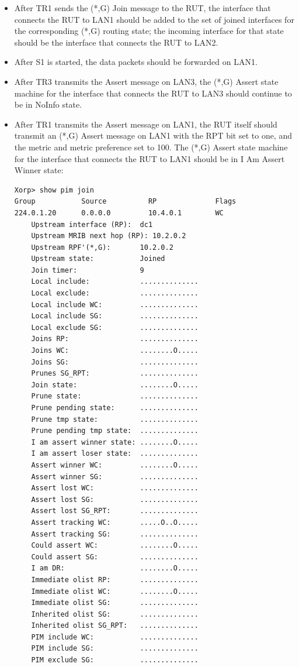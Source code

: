 \documentclass[11pt]{report}
\begin{document}

\begin{itemize}

  \item After TR1 sends the (*,G) Join message to the RUT, the interface that
  connects the RUT to LAN1 should be added to the set of joined interfaces for
  the corresponding (*,G) routing state; the incoming interface for that state
  should be the interface that connects the RUT to LAN2.

  \item After S1 is started, the data packets should be forwarded on LAN1.

  \item After TR3 transmits the Assert message on LAN3, the (*,G) Assert state
  machine for the interface that connects the RUT to LAN3 should continue to
  be in NoInfo state.

  \item After TR1 transmits the Assert message on LAN1, the RUT itself should
  transmit an (*,G) Assert message on LAN1 with the RPT bit set to one,
  and the metric and metric preference set to 100. The (*,G) Assert state
  machine for the interface that connects the RUT to LAN1 should be in I Am
  Assert Winner state:

\begin{verbatim}
Xorp> show pim join 
Group           Source          RP              Flags
224.0.1.20      0.0.0.0         10.4.0.1        WC   
    Upstream interface (RP):  dc1
    Upstream MRIB next hop (RP): 10.2.0.2
    Upstream RPF'(*,G):       10.2.0.2
    Upstream state:           Joined 
    Join timer:               9
    Local include:            ..............
    Local exclude:            ..............
    Local include WC:         ..............
    Local include SG:         ..............
    Local exclude SG:         ..............
    Joins RP:                 ..............
    Joins WC:                 ........O.....
    Joins SG:                 ..............
    Prunes SG_RPT:            ..............
    Join state:               ........O.....
    Prune state:              ..............
    Prune pending state:      ..............
    Prune tmp state:          ..............
    Prune pending tmp state:  ..............
    I am assert winner state: ........O.....
    I am assert loser state:  ..............
    Assert winner WC:         ........O.....
    Assert winner SG:         ..............
    Assert lost WC:           ..............
    Assert lost SG:           ..............
    Assert lost SG_RPT:       ..............
    Assert tracking WC:       .....O..O.....
    Assert tracking SG:       ..............
    Could assert WC:          ........O.....
    Could assert SG:          ..............
    I am DR:                  ........O.....
    Immediate olist RP:       ..............
    Immediate olist WC:       ........O.....
    Immediate olist SG:       ..............
    Inherited olist SG:       ..............
    Inherited olist SG_RPT:   ..............
    PIM include WC:           ..............
    PIM include SG:           ..............
    PIM exclude SG:           ..............
\end{verbatim}


\end{itemize}
\end{document}

